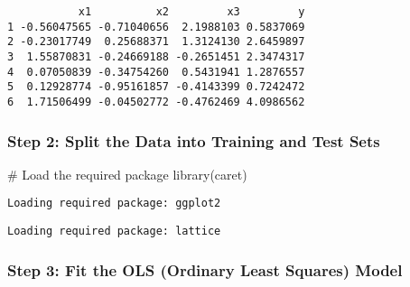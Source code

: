 \documentclass[
  letterpaper,
  DIV=11,
  numbers=noendperiod]{scrartcl}
\newenvironment{Shaded}{\begin{snugshade}}{\end{snugshade}}
\newcommand{\AttributeTok}[1]{\textcolor[rgb]{0.40,0.45,0.13}{#1}}
\newcommand{\CommentTok}[1]{\textcolor[rgb]{0.37,0.37,0.37}{#1}}
\newcommand{\ConstantTok}[1]{\textcolor[rgb]{0.56,0.35,0.01}{#1}}
\newcommand{\DecValTok}[1]{\textcolor[rgb]{0.68,0.00,0.00}{#1}}
\newcommand{\FloatTok}[1]{\textcolor[rgb]{0.68,0.00,0.00}{#1}}
\newcommand{\FunctionTok}[1]{\textcolor[rgb]{0.28,0.35,0.67}{#1}}
\newcommand{\NormalTok}[1]{\textcolor[rgb]{0.00,0.23,0.31}{#1}}
\newcommand{\OtherTok}[1]{\textcolor[rgb]{0.00,0.23,0.31}{#1}}
\newcommand{\SpecialCharTok}[1]{\textcolor[rgb]{0.37,0.37,0.37}{#1}}
\begin{document}
\begin{verbatim}
           x1          x2         x3         y
1 -0.56047565 -0.71040656  2.1988103 0.5837069
2 -0.23017749  0.25688371  1.3124130 2.6459897
3  1.55870831 -0.24669188 -0.2651451 2.3474317
4  0.07050839 -0.34754260  0.5431941 1.2876557
5  0.12928774 -0.95161857 -0.4143399 0.7242472
6  1.71506499 -0.04502772 -0.4762469 4.0986562
\end{verbatim}

\hypertarget{step-2-split-the-data-into-training-and-test-sets}{%
\subsubsection{Step 2: Split the Data into Training and Test
Sets}\label{step-2-split-the-data-into-training-and-test-sets}}

\begin{Shaded}
\begin{Highlighting}[]
\CommentTok{\# Load the required package}
\FunctionTok{library}\NormalTok{(caret)}
\end{Highlighting}
\end{Shaded}

\begin{verbatim}
Loading required package: ggplot2
\end{verbatim}

\begin{verbatim}
Loading required package: lattice
\end{verbatim}

\begin{Shaded}
\end{Shaded}

\hypertarget{step-3-fit-the-ols-ordinary-least-squares-model}{%
\subsubsection{Step 3: Fit the OLS (Ordinary Least Squares)
Model}\label{step-3-fit-the-ols-ordinary-least-squares-model}}
\end{document}
